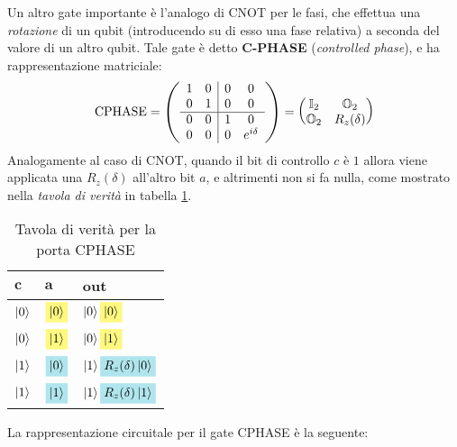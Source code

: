 \documentclass[../../InformazioneQuantistica.tex]{subfiles}
\begin{document}
Un altro gate importante è l'analogo di CNOT per le fasi, che effettua una \textit{rotazione} di un qubit (introducendo su di esso una fase relativa) a seconda  del valore di un altro qubit. Tale gate è detto \textbf{C-PHASE} (\textit{controlled phase}), e ha rappresentazione matriciale:
\begin{align*}
\operatorname{CPHASE} =
\left(
        \begin{array}{cc|cc}
        1 & 0 & 0 & 0 \\
        0 & 1 & 0 & 0 \\
        \hline
        0 & 0 & 1 & 0 \\
        0 & 0 & 0 & e^{i\delta} \\        
        \end{array}
\right)=
\begin{pmatrix}
\mathbb{I}_2 & \mathbb{O}_2\\
\mathbb{O}_2 & R_z(\delta)
\end{pmatrix}
\end{align*}
Analogamente al caso di CNOT, quando il bit di controllo $c$ è $1$ allora viene applicata una $R_z(\delta)$ all'altro bit $a$, e altrimenti non si fa nulla, come mostrato nella \textit{tavola di verità} in tabella \ref{tab:C-PHASE}.

\begin{table}[H]
\centering
\begin{tabular}{@{}lll@{}}
\toprule
$\bm{c}$ & $\bm{a}$ & \textbf{out} \\ \midrule
$\Ket{0}$ & $\hlc{Yellow}{\ket{0}}$ & $\ket{0}\hlc{Yellow}{\ket{0}}$ \\
$\Ket{0}$ & $\hlc{Yellow}{\ket{1}}$ & $\ket{0}\hlc{Yellow}{\ket{1}}$ \\
$\Ket{1}$ & $\hlc{SkyBlue}{\ket{0}}$ & $\ket{1}\hlc{SkyBlue}{R_z(\delta)\ket{0}}$ \\
$\Ket{1}$ & $\hlc{SkyBlue}{\ket{1}}$ & $\ket{1}\hlc{SkyBlue}{R_z(\delta)\ket{1}}$ \\ \bottomrule
\end{tabular}
\caption{Tavola di verità per la porta CPHASE}
\label{tab:C-PHASE}
\end{table}

La rappresentazione circuitale per il gate CPHASE è la seguente:

\end{document}

